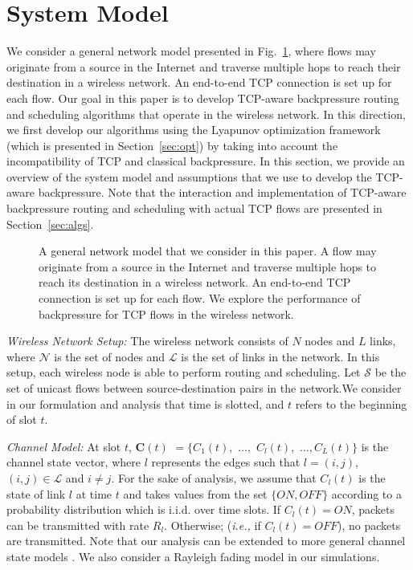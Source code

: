 \documentclass[conference]{IEEEtran}
\newcommand{\ie}{{\em i.e., }}
\newcommand{\Sset}{\mathcal{S}}
\newcommand{\Nset}{\mathcal{N}}
\newcommand{\Lset}{\mathcal{L}}
\begin{document}
\section{System Model}\label{sec:system}
We consider a general network model presented in Fig.~\ref{fig:main-example}, where flows may originate from a source in the Internet and traverse multiple hops to reach their destination in a wireless network. An end-to-end TCP connection is set up for each flow.
Our goal in this paper is to develop TCP-aware backpressure routing and scheduling algorithms that operate in the wireless network. In this direction, we first develop our algorithms using the Lyapunov optimization framework (which is presented in Section~\ref{sec:opt}) by taking into account the incompatibility of TCP and classical backpressure. In this section, we provide an overview of the system model and assumptions that we use to develop the TCP-aware backpressure. Note that the interaction and implementation of TCP-aware backpressure routing and scheduling with actual TCP flows are presented in Section~\ref{sec:algs}.

\begin{figure}
\vspace{-10pt}
\centering
{}
\vspace{-5pt}
\caption{\scriptsize A general network model that we consider in this paper. A flow may originate from a source in the Internet and traverse multiple hops to reach its destination in a wireless network. An end-to-end TCP connection is set up for each flow. We explore the performance of backpressure for TCP flows in the wireless network.}
\label{fig:main-example}
\vspace{-20pt}
\end{figure}


{\em Wireless Network Setup:} The wireless network consists of $N$ nodes and $L$ links, where $\Nset$ is the set of nodes and $\Lset$ is the set of links in the network. In this setup, each wireless node is able to perform routing and scheduling. Let $\Sset$ be the set of unicast flows between source-destination pairs in the network.We consider in our formulation and analysis that time is slotted, and $t$ refers to the beginning of slot $t$.

{\em Channel Model:} At slot $t$, $\boldsymbol C(t)$ $= \{C_{1}(t),$ $...,$ $C_{l}(t),$ $..., C_{L}(t)\}$ is the channel state vector, where $l$ represents the edges such that $l = (i,j)$, $(i,j) \in \Lset$ and $i \neq j$. For the sake of analysis, we assume that $C_{l}(t)$ is the state of link $l$ at time $t$ and takes values from the set $\{ON,OFF\}$ according to a probability distribution which is i.i.d. over time slots. If  $C_{l}(t) = ON$, packets can be transmitted with rate $R_l$. Otherwise; (\ie if $C_{l}(t) = OFF$), no packets are transmitted. Note that our analysis can be extended to more general channel state models \cite{neely_book}. We also consider a Rayleigh fading model in our simulations.
\end{document}
